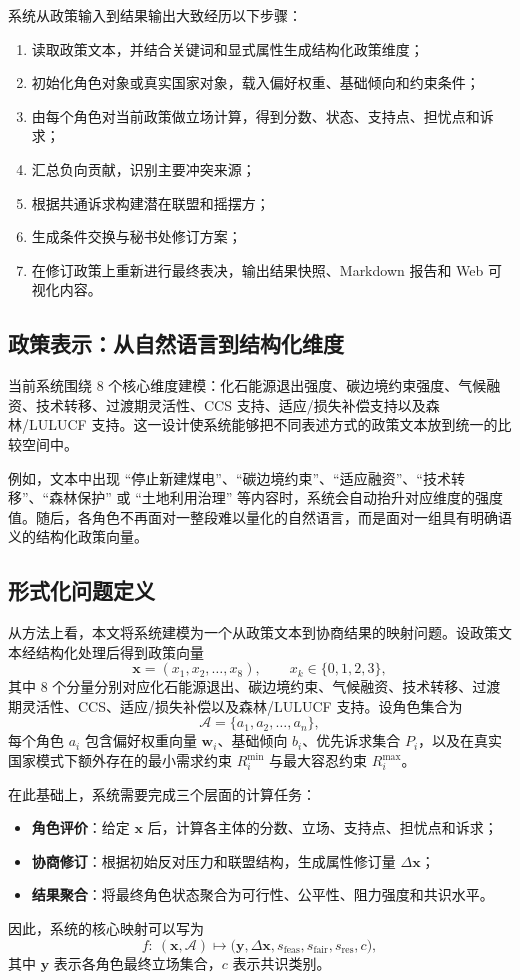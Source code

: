 \documentclass[12pt,a4paper]{ctexart}
\begin{document}
系统从政策输入到结果输出大致经历以下步骤：
\begin{enumerate}
  \item 读取政策文本，并结合关键词和显式属性生成结构化政策维度；
  \item 初始化角色对象或真实国家对象，载入偏好权重、基础倾向和约束条件；
  \item 由每个角色对当前政策做立场计算，得到分数、状态、支持点、担忧点和诉求；
  \item 汇总负向贡献，识别主要冲突来源；
  \item 根据共通诉求构建潜在联盟和摇摆方；
  \item 生成条件交换与秘书处修订方案；
  \item 在修订政策上重新进行最终表决，输出结果快照、Markdown 报告和 Web 可视化内容。
\end{enumerate}

\subsection{政策表示：从自然语言到结构化维度}
当前系统围绕 8 个核心维度建模：化石能源退出强度、碳边境约束强度、气候融资、技术转移、过渡期灵活性、CCS 支持、适应/损失补偿支持以及森林/LULUCF 支持。这一设计使系统能够把不同表述方式的政策文本放到统一的比较空间中。

例如，文本中出现 ``停止新建煤电''、``碳边境约束''、``适应融资''、``技术转移''、``森林保护'' 或 ``土地利用治理'' 等内容时，系统会自动抬升对应维度的强度值。随后，各角色不再面对一整段难以量化的自然语言，而是面对一组具有明确语义的结构化政策向量。

\subsection{形式化问题定义}
从方法上看，本文将系统建模为一个从政策文本到协商结果的映射问题。设政策文本经结构化处理后得到政策向量
\[
\mathbf{x}=(x_1,x_2,\dots,x_8), \qquad x_k \in \{0,1,2,3\},
\]
其中 8 个分量分别对应化石能源退出、碳边境约束、气候融资、技术转移、过渡期灵活性、CCS、适应/损失补偿以及森林/LULUCF 支持。设角色集合为
\[
\mathcal{A}=\{a_1,a_2,\dots,a_n\},
\]
每个角色 \(a_i\) 包含偏好权重向量 \(\mathbf{w}_i\)、基础倾向 \(b_i\)、优先诉求集合 \(P_i\)，以及在真实国家模式下额外存在的最小需求约束 \(R_i^{\min}\) 与最大容忍约束 \(R_i^{\max}\)。

在此基础上，系统需要完成三个层面的计算任务：
\begin{itemize}
  \item \textbf{角色评价}：给定 \(\mathbf{x}\) 后，计算各主体的分数、立场、支持点、担忧点和诉求；
  \item \textbf{协商修订}：根据初始反对压力和联盟结构，生成属性修订量 \(\Delta \mathbf{x}\)；
  \item \textbf{结果聚合}：将最终角色状态聚合为可行性、公平性、阻力强度和共识水平。
\end{itemize}
因此，系统的核心映射可以写为
\[
f:\ (\mathbf{x}, \mathcal{A}) \mapsto \bigl(\mathbf{y}, \Delta \mathbf{x}, s_{\mathrm{feas}}, s_{\mathrm{fair}}, s_{\mathrm{res}}, c \bigr),
\]
其中 \(\mathbf{y}\) 表示各角色最终立场集合，\(c\) 表示共识类别。
\end{document}
